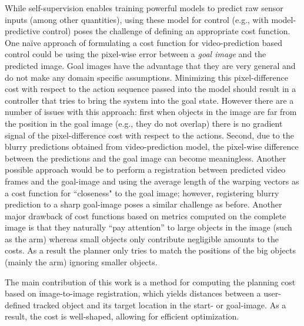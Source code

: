 While self-supervision enables training powerful models to predict raw sensor inputs (among other quantities), using these model for control (e.g., with model-predictive control) poses the challenge of defining an appropriate cost function. One na\"{i}ve approach of formulating a cost function for video-prediction based control could be using the pixel-wise error between a \emph{goal image} and the predicted image. Goal images have the advantage that they are very general and do not make any domain specific assumptions. Minimizing this pixel-difference cost with respect to the action sequence passed into the model should result in a controller that tries to bring the system into the goal state. However there are a number of issues with this approach: first when objects in the image are far from the position in the goal image (e.g., they do not overlap) there is no gradient signal of the pixel-difference cost with respect to the actions. Second, due to the blurry predictions obtained from video-prediction model, the pixel-wise difference between the predictions and the goal image can become meaningless. Another possible approach would be to perform a registration between predicted video frames and the goal-image and using the average length of the warping vectors as a cost function for ``closeness" to the goal image; however, registering blurry prediction to a sharp goal-image poses a similar challenge as before. Another major drawback of cost functions based on metrics computed on the complete image is that they naturally ``pay attention'' to large objects in the image (such as the arm) whereas small objects only contribute negligible amounts to the costs. As a result the planner only tries to match the positions of the big objects (mainly the arm) ignoring smaller objects.

The main contribution of this work is a method for computing the planning cost based on image-to-image registration, which yields distances between a user-defined tracked object and its target location in the start- or goal-image. As a result, the cost is well-shaped, allowing for efficient optimization.

